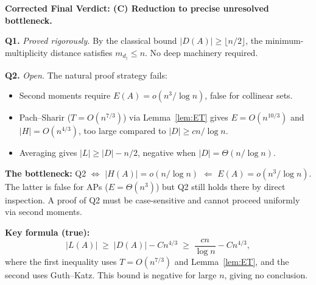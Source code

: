 \documentclass[12pt,a4paper]{amsart}
\def\cL{\textit{L}}\def\cH{\textit{H}}%
\theoremstyle{plain}
\theoremstyle{definition}
\newcommand{\cL}{\mathcal{L}}
\newcommand{\cH}{\mathcal{H}}
\begin{document}
\begin{mdframed}[style=mainresult]
\textbf{Corrected Final Verdict: (C) Reduction to precise unresolved bottleneck.}

\medskip
\textbf{Q1.}
\emph{Proved rigorously.}  By the classical bound $|D(A)|\ge\lfloor n/2\rfloor$,
the minimum-multiplicity distance satisfies $m_{d_\dag}\le n$.
No deep machinery required.

\medskip
\textbf{Q2.}
\emph{Open.}  The natural proof strategy fails:
\begin{itemize}
\item Second moments require $E(A)=o(n^3/\log n)$, false for collinear sets.
\item Pach--Sharir ($T=O(n^{7/3})$) via Lemma~\ref{lem:ET} gives
      $E=O(n^{10/3})$ and $|\cH|=O(n^{4/3})$,
      too large compared to $|D|\ge cn/\log n$.
\item Averaging gives $|\cL|\ge|D|-n/2$, negative when $|D|=\Theta(n/\log n)$.
\end{itemize}

\medskip
\textbf{The bottleneck:}
Q2 $\Longleftrightarrow$ $|\cH(A)|=o(n/\log n)$
$\Longleftarrow$ $E(A)=o(n^3/\log n)$.
The latter is false for APs ($E=\Theta(n^3)$) but Q2 still holds
there by direct inspection.  A proof of Q2 must be case-sensitive
and cannot proceed uniformly via second moments.

\medskip
\textbf{Key formula (true):}
\[
  |\cL(A)| \;\ge\; |D(A)| - C n^{4/3}
  \;\ge\; \frac{cn}{\log n} - Cn^{4/3},
\]
where the first inequality uses $T=O(n^{7/3})$ and
Lemma~\ref{lem:ET}, and the second uses Guth--Katz.
This bound is negative for large $n$, giving no conclusion.
\end{mdframed}



\end{document}

